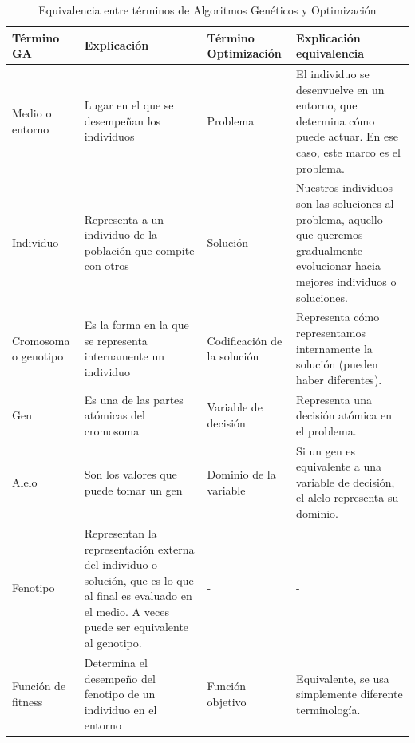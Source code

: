 \begin{table}[htbp]
\centering
\begin{tabular}{|p{4cm}|p{4cm}|p{4cm}|p{4cm}|}
\hline
\textbf{Término GA} & \textbf{Explicación} & \textbf{Término Optimización} & \textbf{Explicación equivalencia} \\
\hline
Medio o entorno & Lugar en el que se desempeñan los individuos & Problema & El individuo se desenvuelve en un entorno, que determina cómo puede actuar. En ese caso, este marco es el problema. \\
\hline
Individuo & Representa a un individuo de la población que compite con otros & Solución & Nuestros individuos son las soluciones al problema, aquello que queremos gradualmente evolucionar hacia mejores individuos o soluciones. \\
\hline
Cromosoma o genotipo & Es la forma en la que se representa internamente un individuo & Codificación de la solución & Representa cómo representamos internamente la solución (pueden haber diferentes). \\
\hline
Gen & Es una de las partes atómicas del cromosoma & Variable de decisión & Representa una decisión atómica en el problema. \\
\hline
Alelo & Son los valores que puede tomar un gen & Dominio de la variable & Si un gen es equivalente a una variable de decisión, el alelo representa su dominio. \\
\hline
Fenotipo & Representan la representación externa del individuo o solución, que es lo que al final es evaluado en el medio. A veces puede ser equivalente al genotipo. & - & - \\
\hline
Función de fitness & Determina el desempeño del fenotipo de un individuo en el entorno & Función objetivo & Equivalente, se usa simplemente diferente terminología. \\
\hline
\end{tabular}
\caption{Equivalencia entre términos de Algoritmos Genéticos y Optimización}
\end{table}


